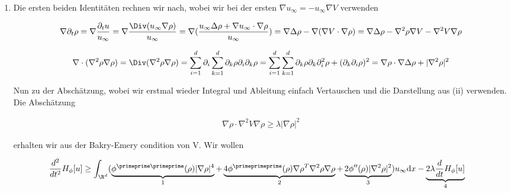 \begin{solution}
\begin{enumerate}[label = (\roman*)]
  \item Die ersten beiden Identitäten rechnen wir nach, wobei wir bei der ersten $\nabla u_\infty = - u_\infty \nabla V$ verwenden

  \begin{align}\label{first}
    \nabla \partial_t \rho
    =
    \nabla \frac{\partial_t u}{u_\infty}
    =
    \nabla \frac{\Div(u_\infty \nabla \rho)}{u_\infty}
    =
    \nabla(\frac{u_\infty \Delta \rho + \nabla u_\infty \cdot \nabla \rho}{u_\infty})
    =
    \nabla \Delta \rho - \nabla (\nabla V \cdot \nabla \rho)
    =
    \nabla \Delta \rho - \nabla^2 \rho \nabla V - \nabla^2 V \nabla \rho
    \end{align}

    \begin{align}\label{second}
    \nabla \cdot (\nabla^2 \rho \nabla \rho)
    =
    \Div(\nabla^2 \rho \nabla \rho)
    =
    \sum_{i=1}^d \partial_i \sum_{k=1}^d \partial_k \rho \partial_i \partial_k \rho
    =
    \sum_{i=1}^d \sum_{k=1}^d \partial_k \rho \partial_k \partial_i^2  \rho + (\partial_k \partial_i \rho)^2
    =
    \nabla \rho \cdot \nabla \Delta \rho + |\nabla^2 \rho|^2
  \end{align}

  Nun zu der Abschätzung, wobei wir erstmal wieder Integral und Ableitung einfach Vertauschen und die Darstellung aus (ii) verwenden. Die Abschätzung

  \begin{align*}
    \nabla \rho \cdot \nabla^2 V \nabla \rho
    \geq
    \lambda |\nabla \rho|^2
  \end{align*}

  erhalten wir aus der Bakry-Emery condition von V. Wir wollen

  \begin{align*}
    \frac{d^2}{d t^2} H_{\phi}[u] &\geq
    \int_{\R^d}(
    \underbrace{
    \phi^{\primeprime \primeprime}(\rho)|\nabla \rho|^4
    }_{1}
    +
    \underbrace{
    4\phi^\primeprimeprime(\rho) \nabla \rho^{T} \nabla^2 \rho \nabla \rho
    }_{2}
    +
    \underbrace{
    2\phi^{\prime \prime}(\rho)|\nabla^{2} \rho|^2
    }_{3}
    ) u_{\infty} \mathrm{d} x
    -\underbrace{
    2 \lambda \frac{d}{d t} H_{\phi}[u]
    }_{4}
    \end{align*}


\end{enumerate}
\end{solution}
